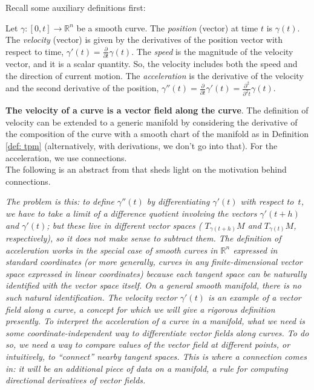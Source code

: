 \documentclass[a4paper,12pt,reqno]{amsbook}
\theoremstyle{definition} %
\newcommand{\1}{\mathbbm{1}}
\theoremstyle{plain}
\theoremstyle{remark}
\begin{document}
Recall some auxiliary definitions first:
\begin{definition}
    Let $\gamma:[0,t] \to \mathbb{R}^n$ be a smooth curve. The \emph{position} (vector) at time $t$ is $\gamma(t)$. The \emph{velocity} (vector) is given by the derivatives of the position vector with respect to time,
$\gamma'(t)= \frac{\partial}{\partial t}\gamma(t)$. The \emph{speed} is the magnitude of the velocity vector, and it is a scalar quantity. So, the
velocity includes both the speed and the direction of current motion.
The \emph{acceleration} is the derivative of the velocity and the second derivative of the position, $\gamma'' (t)=
\frac{\partial}{\partial t}\gamma'(t)=\frac{\partial^2}{\partial^2 t}\gamma(t)$.
\end{definition}

\textbf{The velocity of a curve is a vector field along the curve}. 
The definition of velocity can be extended to a generic manifold by considering the derivative of the composition of the curve with a smooth chart of the manifold as in Definition \ref{def: tpm} (alternatively, with derivations, we don't go into that). For the acceleration, we use connections. 
\\

The following is an abstract from \cite{lee2018riemann} that sheds light on the motivation behind connections. 


\textit{The problem is this: to define $\gamma''(t)$ by differentiating $\gamma'(t)$ with respect to~$t$, we have to take a limit of a difference quotient involving the vectors $\gamma'(t+h)$ and $\gamma'(t)$; but these live in different vector spaces ( $T_{\gamma(t+h)}M$ and $T_{\gamma(t)}M$, respectively), so it does not make sense to subtract them.  The definition of acceleration works in the special case of smooth curves in $\mathbb{R}^n$ expressed in standard coordinates (or more generally, curves in any finite-dimensional vector space expressed in linear coordinates) because each tangent space can be naturally identified with the vector space itself.  On a general smooth manifold, there is no such natural identification.
The velocity vector $\gamma'(t)$ is an example of a vector field along a curve, a concept for which we will give a rigorous definition presently.  To interpret the acceleration of a curve in a manifold, what we need is some coordinate-independent way to differentiate vector fields along curves.  To do so, we need a way to compare values of the vector field at different points, or intuitively, to “connect” nearby tangent spaces.  This is where a connection comes in: it will be an additional piece of data on a manifold, a rule for computing directional derivatives of vector fields.}
\end{document}
